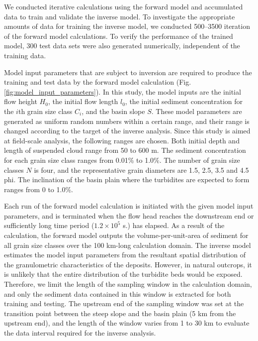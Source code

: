 We conducted iterative calculations using the forward model and accumulated data to train and validate the inverse model. To investigate the appropriate amounts of data for training the inverse model, we conducted 500--3500 iteration of the forward model calculations. To verify the performance of the trained model, 300 test data sets were also generated numerically, independent of the training data.

Model input parameters that are subject to inversion are required to produce the training and test data by the forward model calculation (Fig. \ref{fig:model_input_parameters}). In this study, the model inputs are the initial flow height $H_0$, the initial flow length $l_0$, the initial sediment concentration for the $i$th grain size class $C_i$, and the basin slope $S$. These model parameters are generated as uniform random numbers within a certain range, and their range is changed according to the target of the inverse analysis. Since this study is aimed at field-scale analysis, the following ranges are chosen. Both initial depth and length of suspended cloud range from 50 to 600 m. The sediment concentration for each grain size class ranges from 0.01\% to 1.0\%. The number of grain size classes $N$ is four, and the representative grain diameters are 1.5, 2.5, 3.5 and 4.5 phi. The inclination of the basin plain where the turbidites are expected to form ranges from 0 to 1.0\%. 

Each run of the forward model calculation is initiated with the given model input parameters, and is terminated when the flow head reaches the downstream end or sufficiently long time period ($1.2 \times 10^5$ s.) has elapsed. As a result of the calculation, the forward model outputs the volume-per-unit-area of sediment for all grain size classes over the 100 km-long calculation domain. The inverse model estimates the model input parameters from the resultant spatial distribution of the granulometric characteristics of the deposits. However, in natural outcrops, it is unlikely that the entire distribution of the turbidite beds would be exposed. Therefore, we limit the length of the sampling window in the calculation domain, and only the sediment data contained in this window is extracted for both training and testing. The upstream end of the sampling window was set at the transition point between the steep slope and the basin plain (5 km from the upstream end), and the length of the window varies from 1 to 30 km to evaluate the data interval required for the inverse analysis.

